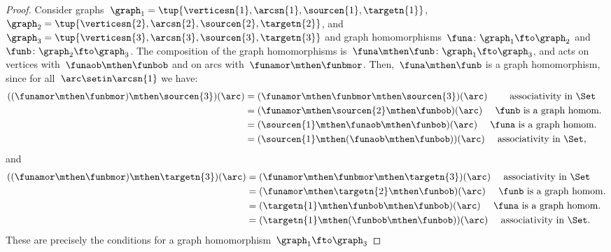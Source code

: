 \begin{proof}
    Consider graphs~$\graph_1=\tup{\verticesn{1},\arcsn{1},\sourcen{1},\targetn{1}}$,~$\graph_2=\tup{\verticesn{2},\arcsn{2},\sourcen{2},\targetn{2}}$, and~$\graph_3=\tup{\verticesn{3},\arcsn{3},\sourcen{3},\targetn{3}}$ and
    graph homomorphisms~$\funa \colon \graph_1 \fto \graph_2$ and~$\funb \colon \graph_2 \fto \graph_3$.
    The composition of the graph homomorphisms is~$\funa\mthen \funb \colon \graph_1 \fto \graph_3$, and acts on vertices with~$\funaob \mthen \funbob$ and on arcs with~$\funamor \mthen \funbmor$.
    Then,~$\funa\mthen \funb$ is a graph homomorphism, since for all~$\arc \setin \arcsn{1}$ we have:
    \begin{equation}
        \begin{aligned}
            ((\funamor\mthen \funbmor) \mthen \sourcen{3})(\arc) & =(\funamor\mthen \funbmor \mthen \sourcen{3})(\arc) \qquad \text{ associativity in \Set} \\
                                                                 & =(\funamor\mthen \sourcen{2} \mthen \funbob)(\arc) \quad \text{ $\funb$ is a graph homom.
            } \\
                                                                 & =(\sourcen{1} \mthen \funaob\mthen \funbob)(\arc) \quad \text{ $\funa$ is a graph homom.} \\
                                                                 & =(\sourcen{1} \mthen (\funaob\mthen \funbob))(\arc) \quad \text{ associativity in \Set},
        \end{aligned}
    \end{equation}
    and
    \begin{equation}
        \begin{aligned}
            ((\funamor \mthen \funbmor) \mthen \targetn{3})(\arc) & =(\funamor \mthen \funbmor \mthen \targetn{3})(\arc) \quad \text{ associativity in \Set} \\
                                                                  & =(\funamor \mthen \targetn{2}\mthen \funbob)(\arc) \quad \text{ $\funb$ is a graph homom.} \\
                                                                  & =(\targetn{1} \mthen \funbob\mthen \funbob)(\arc)\quad \text{ $\funa$ is a graph homom.} \\
                                                                  & =(\targetn{1} \mthen (\funbob\mthen \funbob))(\arc)\quad \text{ associativity in \Set}.
        \end{aligned}
    \end{equation}
    These are precisely the conditions for a graph homomorphism~$\graph_1 \fto \graph_3$
\end{proof}
